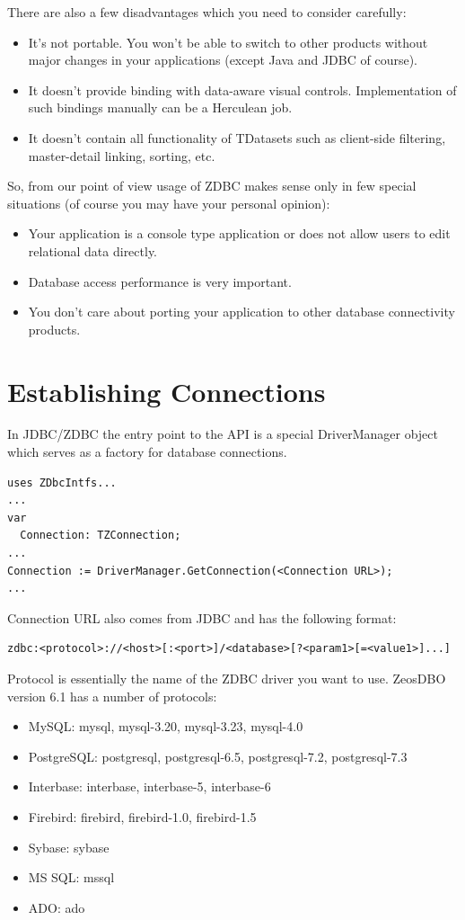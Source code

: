 \documentclass[a4paper,12pt,oneside]{book}
\begin{document}
There are also a few disadvantages which you need to consider carefully: 
\begin{itemize}
  \item It's not portable. You won’t be able to switch to other products without major changes in your applications (except Java and JDBC of course).
  \item It doesn't provide binding with data-aware visual controls. Implementation of such bindings manually can be a Herculean job.
  \item It doesn't contain all functionality of TDatasets such as client-side filtering, master-detail linking, sorting, etc.
\end{itemize}

So, from our point of view usage of ZDBC makes sense only in few special situations (of course you may have your personal opinion):
\begin{itemize}
  \item Your application is a console type application or does not allow users to edit relational data directly.
  \item Database access performance is very important.
  \item You don't care about porting your application to other database connectivity products.
\end{itemize}

\chapter{Establishing Connections}
In JDBC/ZDBC the entry point to the API is a special DriverManager object which serves as a factory for database connections. 

\begin{verbatim}
uses ZDbcIntfs...
...
var
  Connection: TZConnection;
...
Connection := DriverManager.GetConnection(<Connection URL>);
...
\end{verbatim}

Connection URL also comes from JDBC and has the following format:
\begin{verbatim}
zdbc:<protocol>://<host>[:<port>]/<database>[?<param1>[=<value1>]...]
\end{verbatim}

Protocol is essentially the name of the ZDBC driver you want to use. ZeosDBO version 6.1 has a number of protocols:
\begin{itemize}
  \item MySQL: mysql, mysql-3.20, mysql-3.23, mysql-4.0
	\item PostgreSQL: postgresql, postgresql-6.5, postgresql-7.2, postgresql-7.3
	\item Interbase: interbase, interbase-5, interbase-6
	\item Firebird: firebird, firebird-1.0, firebird-1.5
	\item Sybase: sybase
	\item MS SQL: mssql
	\item ADO: ado
\end{itemize}
\end{document}
